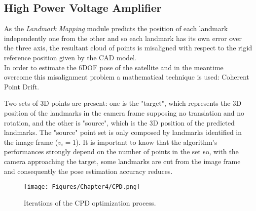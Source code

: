 \subsection{High Power Voltage Amplifier}
\label{Chapter4/CPD}
As the \textit{Landmark Mapping} module predicts the position of each landmark independently one from the other and so each landmark has its own error over the three axis, the resultant cloud of points is misaligned with respect to the rigid reference position given by the CAD model.\\
In order to estimate the 6DOF pose of the satellite and in the meantime overcome this misalignment problem a mathematical technique is used: Coherent Point Drift.

Two sets of 3D points are present: one is the "target", which represents the 3D position of the landmarks in the camera frame supposing no translation and no rotation, and the other is "source", which is the 3D position of the predicted landmarks.
The "source" point set is only composed by landmarks identified in the image frame (\(v_i = 1\)). It is important to know that the algorithm's performances strongly depend on the number of points in the set so, with the camera approaching the target, some landmarks are cut from the image frame and consequently the pose estimation accuracy reduces.

\begin{figure}[H]
    \centering
    \texttt{[image: Figures/Chapter4/CPD.png]}
    \caption[Iterations of the CPD optimization process.]{Iterations of the CPD optimization process.}
    \label{fig:CPD}
\end{figure}